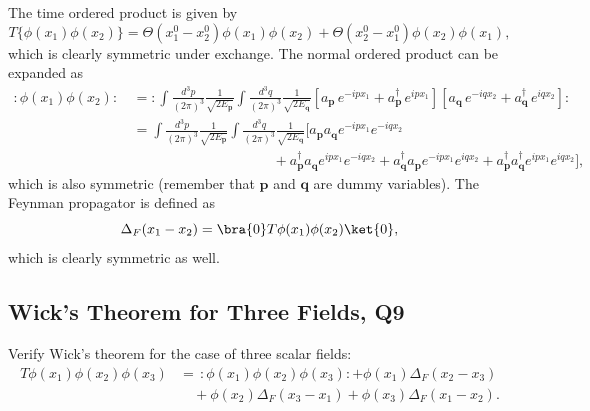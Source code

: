 \begin{solution}
    The time ordered product is given by
    \begin{equation}
        T\{\phi(x_1)\phi(x_2)\} = \Theta(x_1^0-x_2^0)\phi(x_1)\phi(x_2) + \Theta(x_2^0-x_1^0)\phi(x_2)\phi(x_1),
    \end{equation}
    which is clearly symmetric under exchange.
    The normal ordered product can be expanded as
    \begin{equation}
    \begin{aligned}
        :\phi(x_1)\phi(x_2): \,&= :\int\frac{d^3p}{(2\pi)^3}\frac{1}{\sqrt{2E_\mathbf{p}}}\int\frac{d^3q}{(2\pi)^3}\frac{1}{\sqrt{2E_\mathbf{q}}}\left[a_{\mathbf{p}}\,e^{-ipx_1} + a_{\mathbf{p}}^\dagger\,e^{ipx_1}\right]\left[a_{\mathbf{q}}\,e^{-iqx_2} + a_{\mathbf{q}}^\dagger\,e^{iqx_2}\right]:\\
        &=\int\frac{d^3p}{(2\pi)^3}\frac{1}{\sqrt{2E_\mathbf{p}}}\int\frac{d^3q}{(2\pi)^3}\frac{1}{\sqrt{2E_\mathbf{q}}}\bigg[a_{\mathbf{p}}a_{\mathbf{q}}e^{-ipx_1}e^{-iqx_2} \\
        &\qquad\qquad\qquad\qquad\qquad+ a_{\mathbf{p}}^\dagger a_{\mathbf{q}}e^{ipx_1}e^{-iqx_2} + a_{\mathbf{q}}^\dagger a_{\mathbf{p}}e^{-ipx_1}e^{iqx_2}+ a_{\mathbf{p}}^\dagger a_{\mathbf{q}}^\dagger e^{ipx_1}e^{iqx_2}\bigg],
    \end{aligned}
    \end{equation}
    which is also symmetric (remember that $\mathbf{p}$ and $\mathbf{q}$ are dummy variables). 
    The Feynman propagator is defined as 
    \begin{equation}
        \Delta_F(x_1-x_2) = \bra{0}T\phi(x_1)\phi(x_2)\ket{0},
    \end{equation}
    which is clearly symmetric as well.
\end{solution}

\subsection{Wick's Theorem for Three Fields, Q9}

Verify Wick's theorem for the case of three scalar fields:
\begin{equation}
\begin{aligned}
    T\phi(x_1)\phi(x_2)\phi(x_3) &= \,:\!\phi(x_1)\phi(x_2)\phi(x_3)\!: +\phi(x_1)\Delta_F(x_2-x_3)\\
    &\quad +\phi(x_2)\Delta_F(x_3-x_1) + \phi(x_3)\Delta_F(x_1-x_2).
\end{aligned}
\end{equation}

